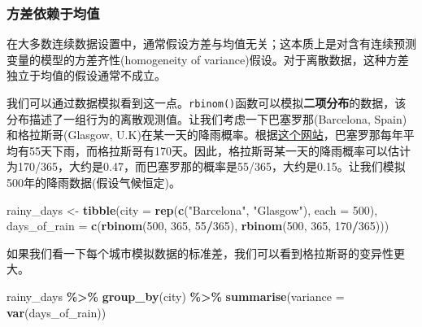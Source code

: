 \documentclass[
]{book}
\newenvironment{Shaded}{\begin{snugshade}}{\end{snugshade}}
\newcommand{\AttributeTok}[1]{\textcolor[rgb]{0.13,0.29,0.53}{#1}}
\newcommand{\DecValTok}[1]{\textcolor[rgb]{0.00,0.00,0.81}{#1}}
\newcommand{\FunctionTok}[1]{\textcolor[rgb]{0.13,0.29,0.53}{\textbf{#1}}}
\newcommand{\NormalTok}[1]{#1}
\newcommand{\OtherTok}[1]{\textcolor[rgb]{0.56,0.35,0.01}{#1}}
\newcommand{\SpecialCharTok}[1]{\textcolor[rgb]{0.81,0.36,0.00}{\textbf{#1}}}
\newcommand{\StringTok}[1]{\textcolor[rgb]{0.31,0.60,0.02}{#1}}
\begin{document}
\hypertarget{ux65b9ux5deeux4f9dux8d56ux4e8eux5747ux503c}{%
\subsubsection{方差依赖于均值}\label{ux65b9ux5deeux4f9dux8d56ux4e8eux5747ux503c}}

在大多数连续数据设置中，通常假设方差与均值无关；这本质上是对含有连续预测变量的模型的方差齐性(homogeneity of variance)假设。对于离散数据，这种方差独立于均值的假设通常不成立。

我们可以通过数据模拟看到这一点。\texttt{rbinom()}函数可以模拟\textbf{二项分布}的数据，该分布描述了一组行为的离散观测值。让我们考虑一下巴塞罗那(Barcelona, Spain)和格拉斯哥(Glasgow, U.K)在某一天的降雨概率。根据\href{https://www.currentresults.com/Weather/Europe/Cities/precipitation-annual-average.php}{这个网站}，巴塞罗那每年平均有55天下雨，而格拉斯哥有170天。因此，格拉斯哥某一天的降雨概率可以估计为170/365，大约是0.47，而巴塞罗那的概率是55/365，大约是0.15。让我们模拟500年的降雨数据(假设气候恒定)。

\begin{Shaded}
\begin{Highlighting}[]
\NormalTok{rainy\_days }\OtherTok{\textless{}{-}} \FunctionTok{tibble}\NormalTok{(}\AttributeTok{city =} \FunctionTok{rep}\NormalTok{(}\FunctionTok{c}\NormalTok{(}\StringTok{"Barcelona"}\NormalTok{, }\StringTok{"Glasgow"}\NormalTok{), }\AttributeTok{each =} \DecValTok{500}\NormalTok{),}
       \AttributeTok{days\_of\_rain =} \FunctionTok{c}\NormalTok{(}\FunctionTok{rbinom}\NormalTok{(}\DecValTok{500}\NormalTok{, }\DecValTok{365}\NormalTok{, }\DecValTok{55}\SpecialCharTok{/}\DecValTok{365}\NormalTok{),}
                        \FunctionTok{rbinom}\NormalTok{(}\DecValTok{500}\NormalTok{, }\DecValTok{365}\NormalTok{, }\DecValTok{170}\SpecialCharTok{/}\DecValTok{365}\NormalTok{))) }
\end{Highlighting}
\end{Shaded}

如果我们看一下每个城市模拟数据的标准差，我们可以看到格拉斯哥的变异性更大。

\begin{Shaded}
\begin{Highlighting}[]
\NormalTok{rainy\_days }\SpecialCharTok{\%\textgreater{}\%}
  \FunctionTok{group\_by}\NormalTok{(city) }\SpecialCharTok{\%\textgreater{}\%}
  \FunctionTok{summarise}\NormalTok{(}\AttributeTok{variance =} \FunctionTok{var}\NormalTok{(days\_of\_rain))}
\end{Highlighting}
\end{Shaded}
\end{document}
